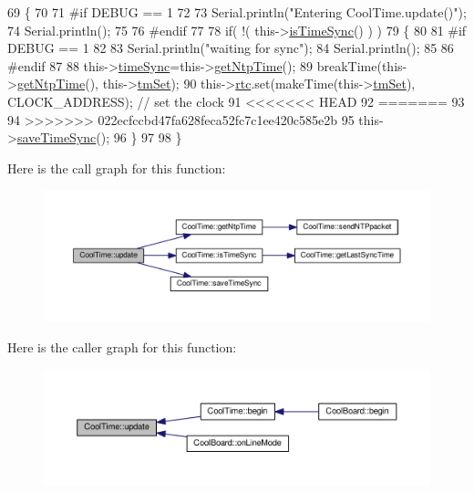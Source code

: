 \begin{DoxyCode}
69 \{
70 
71 \textcolor{preprocessor}{#if DEBUG == 1}
72 
73     Serial.println(\textcolor{stringliteral}{"Entering CoolTime.update()"});
74     Serial.println();
75 
76 \textcolor{preprocessor}{#endif }
77 
78     \textcolor{keywordflow}{if}( !( this->\hyperlink{classCoolTime_a5ae038a4498602b189f76a10bf02adf8}{isTimeSync}() ) )
79     \{
80     
81 \textcolor{preprocessor}{    #if DEBUG == 1}
82 
83         Serial.println(\textcolor{stringliteral}{"waiting for sync"});
84         Serial.println();
85 
86 \textcolor{preprocessor}{    #endif }
87 
88         this->\hyperlink{classCoolTime_a9d032e76c3470a15b3bbbc52af6463f7}{timeSync}=this->\hyperlink{classCoolTime_a41fbbbfd651c2079f54d4b2911e4c705}{getNtpTime}();
89         breakTime(this->\hyperlink{classCoolTime_a41fbbbfd651c2079f54d4b2911e4c705}{getNtpTime}(), this->\hyperlink{classCoolTime_ad33c2713c903ff064ad09c46406ae088}{tmSet});
90         this->\hyperlink{classCoolTime_abd38f2384ff90692b1568d9db869412e}{rtc}.set(makeTime(this->\hyperlink{classCoolTime_ad33c2713c903ff064ad09c46406ae088}{tmSet}), CLOCK\_ADDRESS); \textcolor{comment}{// set the clock}
91 <<<<<<< HEAD
92 =======
93 
94 >>>>>>> 022ecfccbd47fa628feca52fc7c1ee420c585e2b
95         this->\hyperlink{classCoolTime_ae9658c9b377510d469e3b88edf33ee85}{saveTimeSync}();
96     \}
97     
98 \}
\end{DoxyCode}
Here is the call graph for this function\+:
\nopagebreak
\begin{figure}[H]
\begin{center}
\leavevmode
\includegraphics[width=350pt]{classCoolTime_aae601f795452cfa48d9fb337aed483a8_cgraph}
\end{center}
\end{figure}
Here is the caller graph for this function\+:
\nopagebreak
\begin{figure}[H]
\begin{center}
\leavevmode
\includegraphics[width=350pt]{classCoolTime_aae601f795452cfa48d9fb337aed483a8_icgraph}
\end{center}
\end{figure}


